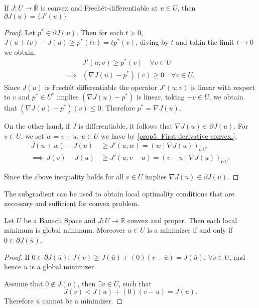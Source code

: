 \begin{theorem}
	If $J: U\rightarrow \overline{\mathbb{R}}$ is convex and Frech\'et-differentiable at $u\in U$, then $\partial J(u)=\lbrace J'(u)\rbrace$
	
	\begin{proof}
		Let $p^* \in \partial J(u)$. Then for each $t>0$, $J(u+tv)-J(u)\geq p^*(tv)=tp^*(v)$, diving by $t$ and takin the limit $t\rightarrow 0$ we obtain,
		\begin{align*}
			&J'(u;v) \geq p^*(v) \quad \forall v \in U \\
	\implies& (\nabla J(u)-p^*)(v) \geq 0 \quad \forall v \in U.
		\end{align*}
	Since $J(u)$ is Frech\'et differentiable the operator $J'(u;v)$ is linear with respect to $v$ and $p^* \in U^*$ implies $(\nabla J(u)-p^*)$ is linear, taking $-v \in U$, we obtain that $(\nabla J(u)-p^*)(v)\leq 0$. Therefore $p^*=\nabla J(u)$.
	
	On the other hand, if $J$ is differentiable, it follows that $\nabla J(u)\in \partial J(u)$. For $v\in U$, we set $w=v-u$, $u\in U$ we have by \eqref{prop5. First derivative convex.}, 
	\begin{align*}
		    J(u+w)-J(u)&\geq J'(u;w)=\left(w\mid \nabla J(u)\right)_{UU^*} \\
	\implies \ J(v)-J(u)&\geq J'(u; v-u) = \left(v-u \mid \nabla J(u)\right)_{UU^*}
	\end{align*}
	
	Since the above inequality holds for all $v \in U$ implies $\nabla J(u) \in \partial J(u)$.
	\end{proof}
\end{theorem}
\begin{remark}
	The subgradient can be used to obtain local optimality conditions that are necessary and sufficient for convex problem.
\end{remark}
\begin{theorem}
	\label{th6. 0 in subdifferential.}
	Let $U$ be a Banach Space and $J: U \rightarrow \mathbb{R}$ convex and proper. Then each local minimum is global minimum.
	Moreover $\overline{u}\in U$ is a minimizer if and only if $0 \in \partial J(\overline{u})$.
	\begin{proof}
		If $0 \in \partial J(\overline{u})$: $J(v) \geq J(\overline{u})+ (0)(v-\overline{u})=J(\overline{u})$, $\forall v\in U$, and hence $\overline{u}$ is a global minimizer. 
		
		
		Assume that $0 \notin J(\overline{u})$, then $\exists v \in U$, such that
		\[
			J(v) < J(\overline{u}) + (0)(v-\overline{u}) = J(\overline{u}).
		\]
		Therefore $\overline{u}$ cannot be a minimizer.
	\end{proof}
\end{theorem}

